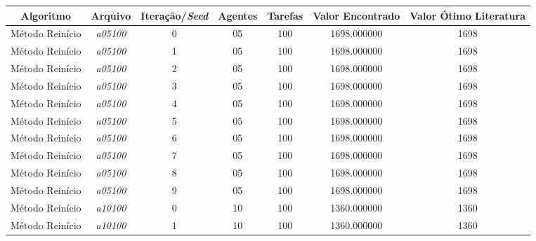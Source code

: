 {\begin{longtable}{cc|c|cc|cc}
			\hline \hline
			\textbf{Algoritmo} & \textbf{Arquivo}   & \textbf{Iteração/\textit{Seed}} & \textbf{Agentes} & \textbf{Tarefas} & \textbf{Valor Encontrado} & \textbf{Valor Ótimo Literatura} \\ \hline
			Método Reinício    & \textit{a05100}    & 0                               & 05               & 100              & 1698.000000                          & 1698 \\ 
			Método Reinício    & \textit{a05100}    & 1                               & 05               & 100              & 1698.000000                          & 1698 \\ 
			Método Reinício    & \textit{a05100}    & 2                               & 05               & 100              & 1698.000000                          & 1698 \\ 
			Método Reinício    & \textit{a05100}    & 3                               & 05               & 100              & 1698.000000                          & 1698 \\ 
			Método Reinício    & \textit{a05100}    & 4                               & 05               & 100              & 1698.000000                          & 1698 \\ 
			Método Reinício    & \textit{a05100}    & 5                               & 05               & 100              & 1698.000000                          & 1698 \\ 
			Método Reinício    & \textit{a05100}    & 6                               & 05               & 100              & 1698.000000                          & 1698 \\ 
			Método Reinício    & \textit{a05100}    & 7                               & 05               & 100              & 1698.000000                          & 1698 \\ 
			Método Reinício    & \textit{a05100}    & 8                               & 05               & 100              & 1698.000000                          & 1698 \\ 
			Método Reinício    & \textit{a05100}    & 9                               & 05               & 100              & 1698.000000                          & 1698 \\ \hline
			Método Reinício    & \textit{a10100}    & 0                               & 10               & 100              & 1360.000000                          & 1360 \\ 
			Método Reinício    & \textit{a10100}    & 1                               & 10               & 100              & 1360.000000                          & 1360 \\ 

\end{longtable}}

